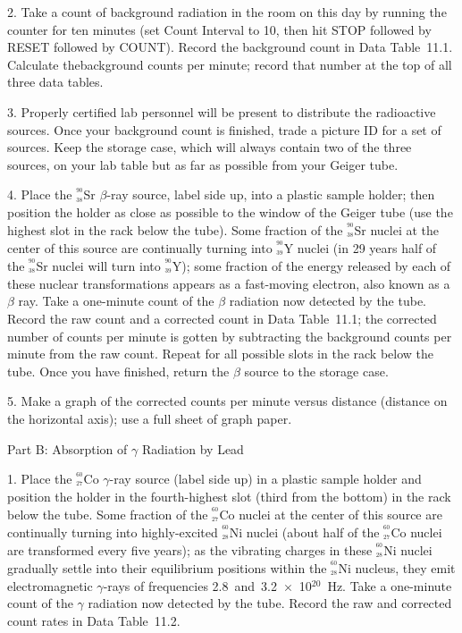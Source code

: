 \item{2.} Take a count of background radiation in the
room on this day by running the counter for ten minutes 
(set Count Interval to 10, then hit STOP followed by RESET 
followed by COUNT).  Record the background count in Data 
Table~11.1.  Calculate the\break background counts 
per minute; record that number at the top of all three 
data tables.

\item{3.} Properly certified lab personnel will be present to 
distribute the radioactive sources.  Once your background count 
is finished, trade a picture ID for a set of sources.  Keep the 
storage case, which will always contain two of the three sources,
on your lab table but as far as possible from your Geiger tube.

\item{4.} Place the $^{^{90}}_{^{38}}$Sr $\beta$-ray source, 
label side up, into a plastic sample holder; then position the
holder as close as possible to the window of the Geiger tube 
(use the highest slot in the rack below the tube).  Some 
fraction of the $^{^{90}}_{^{38}}$Sr nuclei at the center of 
this source are continually turning into $^{^{90}}_{^{39}}$Y 
nuclei (in 29 years half of the $^{^{90}}_{^{38}}$Sr nuclei 
will turn into $^{^{90}}_{^{39}}$Y); some fraction of the 
energy released by each of these nuclear transformations 
appears as a fast-moving electron, also known as a $\beta$ 
ray.  Take a one-minute count of the $\beta$ radiation now 
detected by the tube.  Record the raw count and a corrected 
count in Data Table~11.1; the corrected number of counts per 
minute is gotten by subtracting the background counts per 
minute from the raw count.  Repeat for all possible slots in 
the rack below the tube.  Once you have finished, return the 
$\beta$ source to the storage case.  

\item{5.} Make a graph of the corrected counts per minute
versus distance (distance on the horizontal axis); use a full
sheet of graph paper. 
\bigskip
\centerline{Part B: Absorption of $\gamma$ Radiation by Lead}
\smallskip
\item{1.} Place the $^{^{60}}_{^{27}}$Co $\gamma$-ray source 
(label side up) in a plastic sample holder and position the 
holder in the fourth-highest slot (third from the bottom)
in the rack below the tube.  Some fraction of the 
$^{^{60}}_{^{27}}$Co nuclei at the center of this source are 
continually turning into highly-excited $^{^{60}}_{^{28}}$Ni 
nuclei (about half of the $^{^{60}}_{^{27}}$Co nuclei are 
transformed every five years); as the vibrating charges in 
these $^{^{60}}_{^{28}}$Ni nuclei gradually settle into their 
equilibrium positions within the $^{^{60}}_{^{28}}$Ni nucleus, 
they emit electromagnetic $\gamma$-rays of frequencies 
2.8~and~3.2~$\times$~10$^{20}$~Hz.  Take a one-minute count 
of the $\gamma$ radiation now detected by the tube.  Record 
the raw and corrected count rates in Data Table~11.2.


